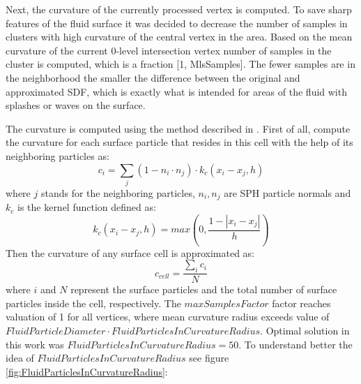 Next, the curvature of the currently processed vertex is computed. To save sharp features of the fluid surface it was decided to decrease the number of samples in clusters with high curvature of the central vertex in the area. Based on the mean curvature of the current 0-level intersection vertex number of samples in the cluster is computed, which is a fraction [1, MlsSamples]. The fewer samples are in the neighborhood the smaller the difference between the original and approximated SDF, which is exactly what is intended for areas of the fluid with splashes or waves on the surface.

The curvature is computed using the method described in \cite{CurvatureComputation}. First of all, compute the curvature for each surface particle that resides in this cell with the help of its neighboring particles as:
\begin{equation}
	c_i = \sum_j{(1 - n_i \cdot n_j)\cdot k_c(x_i-x_j, h)}
\end{equation}
where $j$ stands for the neighboring particles, $n_i, n_j$ are SPH particle normals and
$k_c$ is the kernel function defined as:
\begin{equation}
	k_c(x_i-x_j, h) = max\left(0, \dfrac{1 - |x_i - x_j|}{h}\right)
\end{equation}
Then the curvature of any surface cell is approximated as:
\begin{equation}
	c_{cell} = \dfrac{\sum_i{c_i}}{N}
\end{equation}
where $i$ and $N$ represent the surface particles and the total number of surface particles inside the cell, respectively. The $maxSamplesFactor$ factor reaches valuation of 1 for all vertices, where mean curvature radius exceeds value of $FluidParticleDiameter \cdot FluidParticlesInCurvatureRadius$. Optimal solution in this work was $FluidParticlesInCurvatureRadius=50$. To understand better the idea of $FluidParticlesInCurvatureRadius$ see figure \ref{fig:FluidParticlesInCurvatureRadius}:
